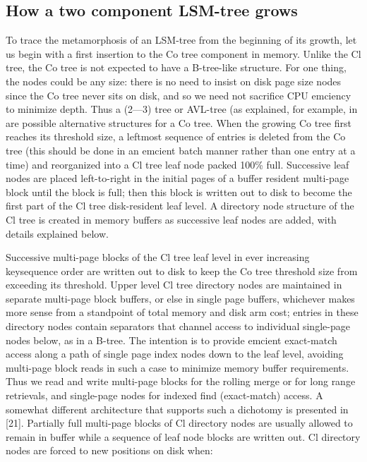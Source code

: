 \documentclass[a4paper,11pt,notitlepage,twoside,openright]{article}
\begin{document}
\hypertarget{how-a-two-component-lsm-tree-grows}{%
\subsection{How a two component LSM-tree
grows}\label{how-a-two-component-lsm-tree-grows}}


To trace the metamorphosis of an LSM-tree from the beginning of its
growth, let us begin with a first insertion to the Co tree component in
memory. Unlike the Cl tree, the Co tree is not expected to have a
B-tree-like structure. For one thing, the nodes could be any size: there
is no need to insist on disk page size nodes since the Co tree never
sits on disk, and so we need not sacrifice CPU emciency to minimize
depth. Thus a (2---3) tree or AVL-tree (as explained, for example, in
are possible alternative structures for a Co tree. When the growing Co
tree first reaches its threshold size, a leftmost sequence of entries is
deleted from the Co tree (this should be done in an emcient batch manner
rather than one entry at a time) and reorganized into a Cl tree leaf
node packed 100\% full. Successive leaf nodes are placed left-to-right
in the initial pages of a buffer resident multi-page block until the
block is full; then this block is written out to disk to become the
first part of the Cl tree disk-resident leaf level. A directory node
structure of the Cl tree is created in memory buffers as successive leaf
nodes are added, with details explained below.

Successive multi-page blocks of the Cl tree leaf level in ever
increasing keysequence order are written out to disk to keep the Co tree
threshold size from exceeding its threshold. Upper level Cl tree
directory nodes are maintained in separate multi-page block buffers, or
else in single page buffers, whichever makes more sense from a
standpoint of total memory and disk arm cost; entries in these directory
nodes contain separators that channel access to individual single-page
nodes below, as in a B-tree. The intention is to provide emcient
exact-match access along a path of single page index nodes down to the
leaf level, avoiding multi-page block reads in such a case to minimize
memory buffer requirements. Thus we read and write multi-page blocks for
the rolling merge or for long range retrievals, and single-page nodes
for indexed find (exact-match) access. A somewhat different architecture
that supports such a dichotomy is presented in {[}21{]}. Partially full
multi-page blocks of Cl directory nodes are usually allowed to remain in
buffer while a sequence of leaf node blocks are written out. Cl
directory nodes are forced to new positions on disk when:
\end{document}

